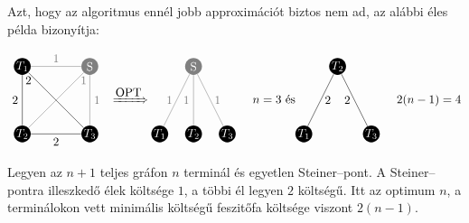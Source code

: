 Azt, hogy az algoritmus ennél jobb approximációt biztos nem ad, az alábbi éles
példa bizonyítja:

\[
\parbox[l]{3cm}{
\begin{tikzpicture}[scale=1]
  \tikzset{ p/.style={circle,white,fill=gray,inner sep=0pt,minimum size=0.5cm},
  }
  \node[p,fill=black] (T1) at (-1,  1) {$T_1$};
  \node[p,fill=black] (T2) at (-1, -1) {$T_2$}; 
  \node[p,fill=black] (T3) at (+1 , -1) {$T_3$};
  \node[p] (S) at (+1 , 1) {S};
  
  \draw[-] (T1) -- (T3) node [at start, below] {$2$}; 
  \draw[-] (T1) -- (T2) node [midway, left] {$2$}; 
  \draw[-] (T2) -- (T3) node [midway, below] {$2$};
  
  \draw[-,gray] (T1) -- (S) node [midway, above] {$1$}; 
  \draw[-,gray] (T2) -- (S) node [at end, below] {$1$}; 
  \draw[-,gray] (T3) -- (S) node [midway, right] {$1$};
\end{tikzpicture}
}
\xRightarrow{\mbox{OPT}}
\parbox[l]{3cm}{
\begin{tikzpicture}[scale=1]
  \tikzset{ p/.style={circle,white,fill=gray,inner sep=0pt,minimum size=0.5cm},
  }
  \node[p,fill=black] (T1) at (-1,  0) {$T_1$};
  \node[p,fill=black] (T2) at (0, 0) {$T_2$}; 
  \node[p,fill=black] (T3) at (+1 , 0) {$T_3$};
  \node[p] (S) at (0 , 2) {S};
  
  \draw[-,gray] (T1) -- (S) node [midway, left] {$1$}; 
  \draw[-,gray] (T2) -- (S) node [midway, left] {$1$}; 
  \draw[-,gray] (T3) -- (S) node [midway, right] {$1$};
\end{tikzpicture}
}
n=3 \mbox{ és}
\parbox[l]{3cm}{
\begin{tikzpicture}[scale=1]
  \tikzset{ p/.style={circle,white,fill=gray,inner sep=0pt,minimum size=0.5cm},
  }
  \node[p,fill=black] (T1) at (-1,  0) {$T_1$};
  \node[p,fill=black] (T2) at (0, 2) {$T_2$}; 
  \node[p,fill=black] (T3) at (+1 , 0) {$T_3$};
  
  \draw[-] (T1) -- (T2) node [midway, right] {$2$}; 
  \draw[-] (T2) -- (T3) node [midway, left] {$2$};  
\end{tikzpicture}
}2(n-1)=4
\]

Legyen az $n+1$ teljes gráfon $n$ terminál és egyetlen Steiner--pont. A
Steiner--pontra illeszkedő élek költsége $1$, a többi él legyen $2$ költségű. 
Itt az optimum $n$, a terminálokon vett minimális költségű feszitőfa költsége
viszont $2(n-1)$.

